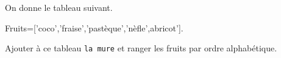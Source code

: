 
On donne le tableau suivant. 

Fruits=['coco','fraise','pastèque','nèfle',abricot']. 

Ajouter à ce tableau \texttt{la mure} et ranger les fruits par ordre alphabétique.